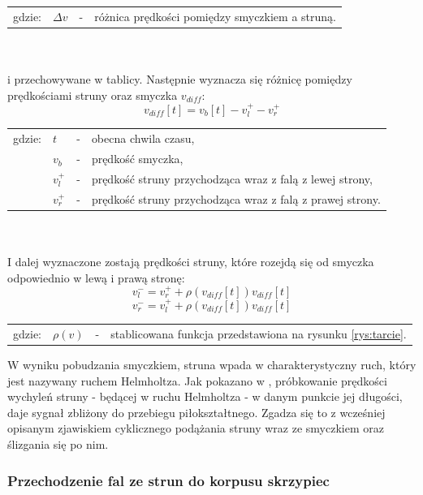 \begin{tabular}{ l l l l}
	gdzie: & $\Delta v$ &  - & różnica prędkości pomiędzy smyczkiem a struną.
\end{tabular} \\ \\
i przechowywane w tablicy. Następnie wyznacza się różnicę pomiędzy prędkościami struny oraz smyczka $v_{diff}$:
\begin{equation} \label{equ:wzor1}
v_{diff}[t] = v_b[t] - v_{l}^{+} - v_{r}^{+}
\end{equation}
\begin{tabular}{ l l l l}
	gdzie: & $t$ &  - & obecna chwila czasu, \\
	&	$v_b$ & - &  prędkość smyczka, \\
	&	$v_{l}^{+}$ & - & prędkość struny przychodząca wraz z falą z lewej strony,\\
	&	$v_{r}^{+}$ & - &  prędkość struny przychodząca wraz z falą z prawej strony.\\
\end{tabular} \\ \\
I dalej wyznaczone zostają prędkości struny, które rozejdą się od smyczka odpowiednio w lewą i prawą stronę:
\begin{equation} \label{equ:wzor2}
v_{l}^{-} = v_r^{+} +  \rho(v_{diff}[t])v_{diff}[t]
\end{equation}
\begin{equation} \label{equ:wzor3}
v_{r}^{-} = v_l^{+} +  \rho(v_{diff}[t])v_{diff}[t]
\end{equation}
\begin{tabular}{ l l l l}
	gdzie: & $\rho(v)$ &  - & stablicowana funkcja przedstawiona na rysunku \ref{rys:tarcie}. \\
	
\end{tabular}
\vspace{6pt}

W wyniku pobudzania smyczkiem, struna wpada w charakterystyczny ruch, który jest nazywany ruchem Helmholtza. Jak pokazano w \cite{bowed_2}, próbkowanie prędkości wychyleń struny - będącej w ruchu Helmholtza - w danym punkcie jej długości, daje sygnał zbliżony do przebiegu piłokształtnego. Zgadza się to z wcześniej opisanym zjawiskiem cyklicznego podążania struny wraz ze smyczkiem oraz ślizgania się po nim.

\subsubsection{Przechodzenie fal ze strun do korpusu skrzypiec}\label{sec:model_violinarma}

